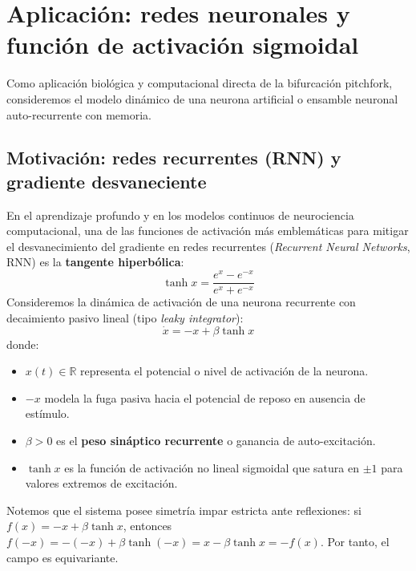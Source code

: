 \section{Aplicación: redes neuronales y función de activación sigmoidal}

Como aplicación biológica y computacional directa de la bifurcación pitchfork, consideremos el modelo dinámico de una neurona artificial o ensamble neuronal auto-recurrente con memoria.

\subsection{Motivación: redes recurrentes (RNN) y gradiente desvaneciente}

En el aprendizaje profundo y en los modelos continuos de neurociencia computacional, una de las funciones de activación más emblemáticas para mitigar el desvanecimiento del gradiente en redes recurrentes (\emph{Recurrent Neural Networks}, RNN) es la \textbf{tangente hiperbólica}:
\begin{equation}
    \tanh x = \frac{e^x - e^{-x}}{e^x + e^{-x}}
\end{equation}
Consideremos la dinámica de activación de una neurona recurrente con decaimiento pasivo lineal (tipo \emph{leaky integrator}):
\begin{equation}
    \dot{x} = -x + \beta \tanh x
    \label{eq:neurona_ode}
\end{equation}
donde:
\begin{itemize}
    \item $x(t) \in \mathbb{R}$ representa el potencial o nivel de activación de la neurona.
    \item $-x$ modela la fuga pasiva hacia el potencial de reposo en ausencia de estímulo.
    \item $\beta > 0$ es el \textbf{peso sináptico recurrente} o ganancia de auto-excitación.
    \item $\tanh x$ es la función de activación no lineal sigmoidal que satura en $\pm 1$ para valores extremos de excitación.
\end{itemize}

Notemos que el sistema posee simetría impar estricta ante reflexiones: si $f(x) = -x + \beta\tanh x$, entonces $f(-x) = -(-x) + \beta\tanh(-x) = x - \beta\tanh x = -f(x)$. Por tanto, el campo es equivariante.

